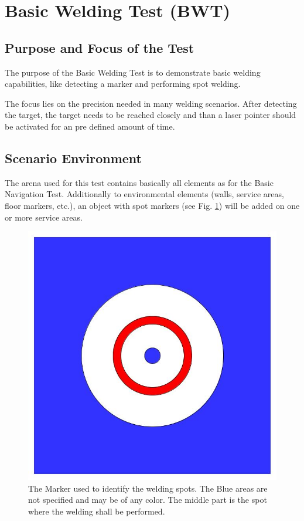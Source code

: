 \section{Basic Welding Test (BWT)}

\subsection{Purpose and Focus of the Test}
The purpose of the Basic Welding Test is to demonstrate basic welding capabilities, like detecting a marker and performing spot welding. 
\par
The focus lies on the precision needed in many welding scenarios. After detecting the target, the target needs to be reached closely and than a laser pointer should be activated for an pre defined amount of time.

\subsection{Scenario Environment}
The arena used for this test contains basically all elements as for the Basic Navigation Test. Additionally to environmental elements (walls, service areas, floor markers, etc.), an object with spot markers (see Fig. \ref{BWT_Label}) will be added on one or more service areas. 

\begin{figure}
\begin{center}
\includegraphics[width=\textwidth/4]{../images/BWT_Marker.jpg} 
\caption{The Marker used to identify the welding spots. The Blue areas are not specified and may be of any color. The middle part is the spot where the welding shall be performed.}
\label{BWT_Label}
\end{center}
\end{figure}


